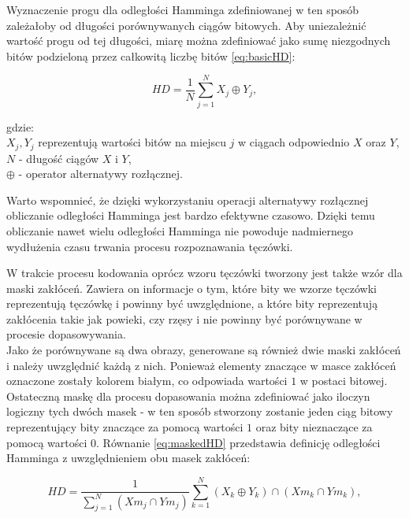\documentclass[10pt,polish,a4paper,oneside]{ppfcmthesis}
\begin{document}
Wyznaczenie progu dla odległości Hamminga zdefiniowanej w ten sposób zależałoby od długości
porównywanych ciągów bitowych. Aby uniezależni\'c wartoś\'c progu od tej długości, miarę można
zdefiniowa\'c jako sumę niezgodnych bitów podzieloną przez całkowitą liczbę bitów \ref{eq:basicHD}:

\begin{equation}
  \mathit{HD} = \frac{1}{N}\sum\limits_{j=1}^{N}X_{j} \oplus Y_{j},
  \label{eq:basicHD}
\end{equation}

\noindent
gdzie:\\
\indent $X_{j}, Y_{j}$ reprezentują wartości bitów na miejscu $j$ w ciągach odpowiednio $X$ oraz $Y$,\\
\indent $N$ - długoś\'c ciągów $X$ i $Y$,\\
\indent $\oplus$ - operator alternatywy rozłącznej.\newline

Warto wspomnie\'c, że dzięki wykorzystaniu operacji alternatywy rozłącznej obliczanie odległości
Hamminga jest bardzo efektywne czasowo. Dzięki temu obliczanie nawet wielu odległości Hamminga nie powoduje
nadmiernego wydłużenia czasu trwania procesu rozpoznawania tęczówki.

W trakcie procesu kodowania oprócz wzoru tęczówki tworzony jest także wzór dla maski zakłóceń.
Zawiera on informacje o tym, które bity we wzorze tęczówki reprezentują tęczówkę i powinny by\'c
uwzględnione, a które bity reprezentują zakłócenia takie jak powieki, czy rzęsy i nie powinny by\'c
porównywane w procesie dopasowywania.\\
Jako że porównywane są dwa obrazy, generowane są również dwie maski zakłóceń i należy uwzględni\'c
każdą z nich. Ponieważ elementy znaczące w masce zakłóceń oznaczone zostały kolorem białym, co odpowiada
wartości $1$ w postaci bitowej. Ostateczną maskę dla procesu dopasowania można zdefiniowa\'c jako
iloczyn logiczny tych dwóch masek - w ten sposób stworzony zostanie jeden ciąg bitowy reprezentujący
bity znaczące za pomocą wartości $1$ oraz bity nieznaczące za pomocą wartości $0$.
Równanie \ref{eq:maskedHD} przedstawia definicję odległości Hamminga z uwzględnieniem obu masek zakłóceń:

\begin{equation}
  \mathit{HD} = \frac{1}{\sum\limits_{j=1}^{N} \left( \mathit{Xm}_{j} \cap \mathit{Ym}_{j} \right) }
       \sum\limits_{k=1}^{N} \left(X_{k} \oplus Y_{k} \right) \cap \left( \mathit{Xm}_{k} \cap \mathit{Ym}_{k} \right),
  \label{eq:maskedHD}
\end{equation}
\end{document}
